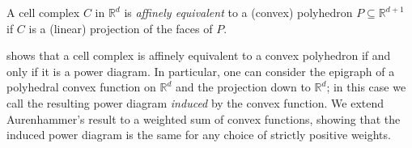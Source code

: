 \documentclass[anon,12pt]{colt2019}
\newcommand{\reals}{\mathbb{R}}
\begin{document}
\begin{definition}
  A cell complex $C$ in $\reals^d$ is \emph{affinely equivalent} to a (convex) polyhedron $P \subseteq \reals^{d+1}$ if $C$ is a (linear) projection of the faces of $P$.
\end{definition}

\citet{aurenhammer1987power} shows that a cell complex is affinely equivalent to a convex polyhedron if and only if it is a power diagram.
In particular, one can consider the epigraph of a polyhedral convex function on $\reals^d$ and the projection down to $\reals^d$; in this case we call the resulting power diagram \emph{induced} by the convex function.
We extend Aurenhammer's result to a weighted sum of convex functions, showing that the induced power diagram is the same for any choice of strictly positive weights.
\end{document}
